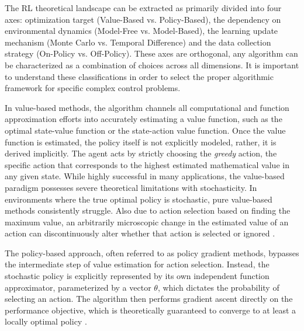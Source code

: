 The RL theoretical landscape can be extracted as primarily divided into four axes: optimization target (Value-Based vs. Policy-Based), the dependency on environmental dynamics (Model-Free vs. Model-Based), the learning update mechanism (Monte Carlo vs. Temporal Difference) and the data collection strategy (On-Policy vs. Off-Policy). These axes are orthogonal, any algorithm can be characterized as a combination of choices across all dimensions. It is important to understand these classifications in order to select the proper algorithmic framework for specific complex control problems.


In value-based methods, the algorithm channels all computational and function approximation efforts into accurately estimating a value function, such as the optimal state-value function or the state-action value function. Once the value function is estimated, the policy itself is not explicitly modeled, rather, it is derived implicitly. The agent acts by strictly choosing the \textit{greedy} action, the specific action that corresponds to the highest estimated mathematical value in any given state. While highly successful in many applications, the value-based paradigm possesses severe theoretical limitations with stochasticity. In environments where the true optimal policy is stochastic, pure value-based methods consistently struggle. Also due to action selection based on finding the maximum value, an arbitrarily microscopic change in the estimated value of an action can discontinuously alter whether that action is selected or ignored \cite{sutton1999policy}.

 The policy-based approach, often referred to as policy gradient methods, bypasses the intermediate step of value estimation for action selection. Instead, the stochastic policy is explicitly represented by its own independent function approximator, parameterized by a vector  $\theta$, which dictates the probability of selecting an action. The algorithm then performs gradient ascent directly on the performance objective, which is theoretically guaranteed to converge to at least a locally optimal policy \cite{sutton1999policy} .%

